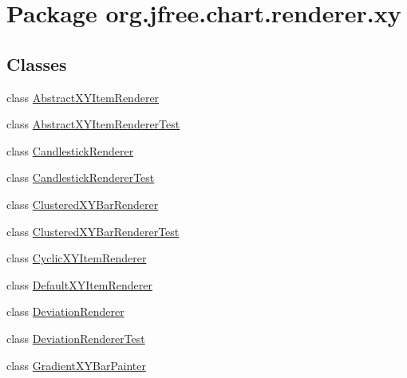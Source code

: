 \hypertarget{namespaceorg_1_1jfree_1_1chart_1_1renderer_1_1xy}{}\section{Package org.\+jfree.\+chart.\+renderer.\+xy}
\label{namespaceorg_1_1jfree_1_1chart_1_1renderer_1_1xy}
\subsection*{Classes}
\begin{DoxyCompactItemize}
\item 
class \mbox{\hyperlink{classorg_1_1jfree_1_1chart_1_1renderer_1_1xy_1_1_abstract_x_y_item_renderer}{Abstract\+X\+Y\+Item\+Renderer}}
\item 
class \mbox{\hyperlink{classorg_1_1jfree_1_1chart_1_1renderer_1_1xy_1_1_abstract_x_y_item_renderer_test}{Abstract\+X\+Y\+Item\+Renderer\+Test}}
\item 
class \mbox{\hyperlink{classorg_1_1jfree_1_1chart_1_1renderer_1_1xy_1_1_candlestick_renderer}{Candlestick\+Renderer}}
\item 
class \mbox{\hyperlink{classorg_1_1jfree_1_1chart_1_1renderer_1_1xy_1_1_candlestick_renderer_test}{Candlestick\+Renderer\+Test}}
\item 
class \mbox{\hyperlink{classorg_1_1jfree_1_1chart_1_1renderer_1_1xy_1_1_clustered_x_y_bar_renderer}{Clustered\+X\+Y\+Bar\+Renderer}}
\item 
class \mbox{\hyperlink{classorg_1_1jfree_1_1chart_1_1renderer_1_1xy_1_1_clustered_x_y_bar_renderer_test}{Clustered\+X\+Y\+Bar\+Renderer\+Test}}
\item 
class \mbox{\hyperlink{classorg_1_1jfree_1_1chart_1_1renderer_1_1xy_1_1_cyclic_x_y_item_renderer}{Cyclic\+X\+Y\+Item\+Renderer}}
\item 
class \mbox{\hyperlink{classorg_1_1jfree_1_1chart_1_1renderer_1_1xy_1_1_default_x_y_item_renderer}{Default\+X\+Y\+Item\+Renderer}}
\item 
class \mbox{\hyperlink{classorg_1_1jfree_1_1chart_1_1renderer_1_1xy_1_1_deviation_renderer}{Deviation\+Renderer}}
\item 
class \mbox{\hyperlink{classorg_1_1jfree_1_1chart_1_1renderer_1_1xy_1_1_deviation_renderer_test}{Deviation\+Renderer\+Test}}
\item 
class \mbox{\hyperlink{classorg_1_1jfree_1_1chart_1_1renderer_1_1xy_1_1_gradient_x_y_bar_painter}{Gradient\+X\+Y\+Bar\+Painter}}

\end{DoxyCompactItemize}
